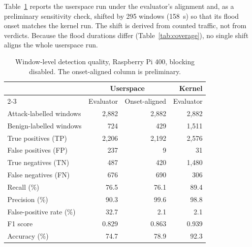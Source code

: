 Table~\ref{tab:detection} reports the userspace run under the
evaluator's alignment and, as a preliminary sensitivity check, shifted by
295 windows (158~s) so that its flood onset matches the kernel run. The
shift is derived from counted traffic, not from verdicts. Because the
flood durations differ (Table~\ref{tab:coverage}), no single shift aligns
the whole userspace run.

\begin{table}[H]
  \centering
  \small
  \begin{tabular}{lrrr}
    \toprule
    & \multicolumn{2}{c}{Userspace} & Kernel \\
    \cmidrule(lr){2-3}
    & Evaluator & Onset-aligned & Evaluator \\
    \midrule
    Attack-labelled windows  & 2,882 & 2,882 & 2,882 \\
    Benign-labelled windows  & 724   & 429   & 1,511 \\
    \midrule
    True positives (TP)      & 2,206 & 2,192 & 2,576 \\
    False positives (FP)     & 237   & 9     & 31 \\
    True negatives (TN)      & 487   & 420   & 1,480 \\
    False negatives (FN)     & 676   & 690   & 306 \\
    \midrule
    Recall (\%)              & 76.5  & 76.1  & 89.4 \\
    Precision (\%)           & 90.3  & 99.6  & 98.8 \\
    False-positive rate (\%) & 32.7  & 2.1   & 2.1 \\
    F1 score                 & 0.829 & 0.863 & 0.939 \\
    Accuracy (\%)            & 74.7  & 78.9  & 92.3 \\
    \bottomrule
  \end{tabular}
  \caption{Window-level detection quality, Raspberry Pi 400, blocking
  disabled. The onset-aligned column is preliminary.}
  \label{tab:detection}
\end{table}

